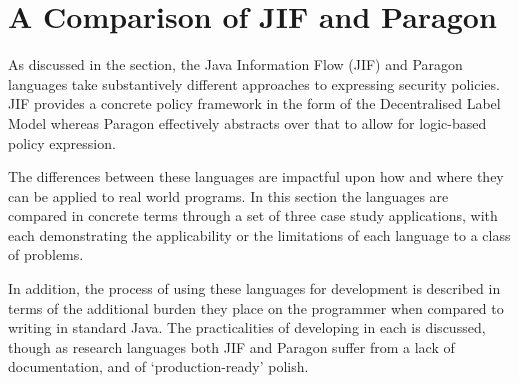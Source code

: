 \chapter{A Comparison of JIF and Paragon}

As discussed in the  section, the Java Information Flow (JIF) and Paragon languages take substantively different approaches to expressing security policies. JIF provides a concrete policy framework in the form of the Decentralised Label Model whereas Paragon effectively abstracts over that to allow for logic-based policy expression.

The differences between these languages are impactful upon how and where they can be applied to real world programs. In this section the languages are compared in concrete terms through a set of three case study applications, with each demonstrating the applicability or the limitations of each language to a class of problems.

In addition, the process of using these languages for development is described in terms of the additional burden they place on the programmer when compared to writing in standard Java. The practicalities of developing in each is discussed, though as research languages both JIF and Paragon suffer from a lack of documentation, and of `production-ready' polish.

\newpage



\newpage



\newpage




%

\newpage

